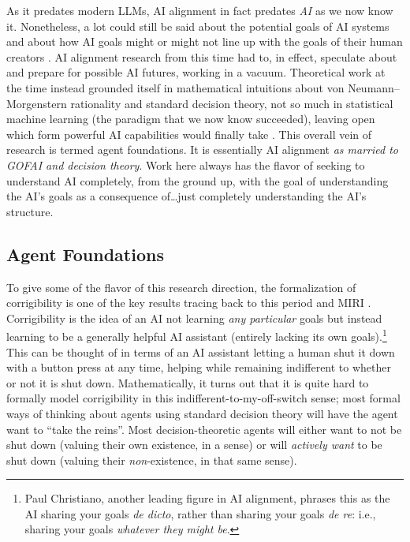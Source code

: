 As it predates modern LLMs, AI alignment in fact predates \emph{AI} as we now
know it. Nonetheless, a lot could still be said about the potential goals of AI
systems and about how AI goals might or might not line up with the goals of
their human creators
\cite{bostrom2014superintelligence,omohundro2008drives,yudkowsky2008factor}. AI
alignment research from this time had to, in effect, speculate about and
prepare for possible AI futures, working in a vacuum. Theoretical work at the
time instead grounded itself in mathematical intuitions about von
Neumann--Morgenstern rationality \cite{von1944games} and standard decision
theory, not so much in statistical machine learning (the paradigm that we now
know succeeded), leaving open which form powerful AI capabilities would finally
take \cite{soares2015corrigibility}. This overall vein of research is termed
agent foundations. It is essentially AI alignment \emph{as married to GOFAI and
decision theory}. Work here always has the flavor of seeking to understand AI
completely, from the ground up, with the goal of understanding the AI's goals
as a consequence of\ldots just completely understanding the AI's structure.

\subsection{Agent Foundations}
To give some of the flavor of this research direction, the formalization of
corrigibility is one of the key results tracing back to this period and MIRI
\cite{soares2015corrigibility}. Corrigibility is the idea of an AI not learning
\emph{any particular} goals but instead learning to be a generally helpful AI
assistant (entirely lacking its own goals).\footnote{Paul Christiano, another
leading figure in AI alignment, phrases this as the AI sharing your goals
\emph{de dicto}, rather than sharing your goals \emph{de re}: i.e., sharing
your goals \emph{whatever they might be}.} This can be thought of in terms of
an AI assistant letting a human shut it down with a button press at any time,
helping while remaining indifferent to whether or not it is shut down.
Mathematically, it turns out that it is quite hard to formally model
corrigibility in this indifferent-to-my-off-switch sense; most formal ways of
thinking about agents using standard decision theory will have the agent want
to ``take the reins''. Most decision-theoretic agents will either want to not
be shut down (valuing their own existence, in a sense) or will \emph{actively
want} to be shut down (valuing their \emph{non}-existence, in that same sense).

